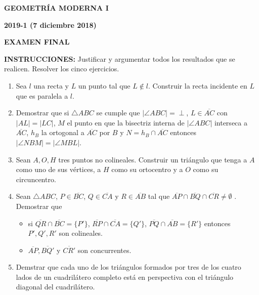 \documentclass[12pt]{report}
\begin{document}
\begin{center}
\textbf{\LARGE {GEOMETRÍA MODERNA I}}
\end{center}

\begin{center}
\textbf{{\large 2019-1 (7 diciembre 2018)}}
\end{center}

\begin{center}
\textbf{{\large EXAMEN FINAL}}
\end{center}

\vspace{1cm}

{\bf INSTRUCCIONES:} Justificar y argumentar todos los resultados que se realicen. Resolver los cinco ejercicios.

\vspace{1cm}

\begin{enumerate}

\item Sea $l$ una recta y $L$ un punto tal que $L\notin l$. Construir la recta incidente en $L$ que es paralela a $l$.

\item Demostrar que si $\triangle ABC$ se cumple que $|\angle ABC|=\perp$, $L\in \overline{AC}$ con $|AL|=|LC|$, $M$ el punto en que la bisectriz interna de $|\angle ABC|$ interseca a $\overline{AC}$, $h_B$ la ortogonal a $\overline{AC}$ por $B$ y $N= h_B \cap \overline{AC}$ entonces $|\angle NBM|=|\angle MBL|$.

\item Sean $A,O, H$ tres puntos no colineales. Construir un triángulo que tenga a $A$ como uno de sus vértices, a $H$ como su ortocentro y a $O$ como su circuncentro.

\item Sean $\triangle ABC$, $P \in \overline{BC}$, $Q \in \overline{CA}$ y $R \in \overline{AB}$ tal que $\overline{AP}\cap \overline{BQ}\cap \overline{CR}\neq \emptyset$ . Demostrar que 

\begin{itemize}

\item si $\overline{QR}\cap \overline {BC}= \{P'\}$, $\overline{RP}\cap \overline {CA}= \{Q'\}$, $\overline{PQ}\cap \overline {AB}= \{R'\}$ entonces $P',Q', R'$ son colineales.

\item $\overline{AP}, \overline{BQ'}$ y $\overline{CR'}$ son concurrentes.

\end{itemize}

\item Demstrar que cada uno de los triángulos formados por tres de los cuatro lados de un cuadrilátero completo está en perspectiva con el triángulo diagonal del cuadrilátero.

\end{enumerate}
\end{document}

